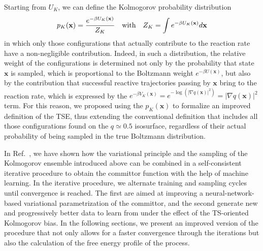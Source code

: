         Starting from $U_K$, we can define the Kolmogorov probability distribution
            \begin{equation}
                p_K(\textbf x) = 
                \frac{e^{-\beta U_K(\textbf{x}) }}{Z_K} \quad\text{with}\quad Z_K=\int e^{-\beta U_K(\textbf{x}) }d\textbf{x}
                \label{eq:kolmogorov_distribution}
            \end{equation}
        in which only those configurations that actually contribute to the reaction rate have a non-negligible contribution.
        Indeed, in such a distribution, the relative weight of the configurations is determined not only by the probability that state $\textbf{x}$ is sampled, which is proportional to the Boltzmann weight $e^{-\beta U(\textbf{x})}$, but also by the contribution that successful reactive trajectories passing by $\textbf{x}$ bring to the reaction rate, which is expressed by the $e^{-\beta V_K(\textbf{x})} = e^{-\log(|\nabla q(\textbf{x})|^2)} = |\nabla q(\textbf{x})|^2$ term. 
        For this reason, we proposed using the $p_K(\textbf{x})$ to formalize an improved definition of the TSE, thus extending the conventional definition that includes all those configurations found on the $q\simeq0.5$ isosurface, regardless of their actual probability of being sampled in the true Boltzmann distribution.

        In Ref.~, we have shown how the variational principle and the sampling of the Kolmogorov ensemble introduced above can be combined in a self-consistent iterative procedure to obtain the committor function with the help of machine learning.
        In the iterative procedure, we alternate training and sampling cycles until convergence is reached. 
        The first are aimed at improving a neural-network-based variational parametrization of the committor, and the second generate new and progressively better data to learn from under the effect of the TS-oriented Kolmogorov bias.
        In the following sections, we present an improved version of the procedure that not only allows for a faster convergence through the iterations but also the calculation of the free energy profile of the process.

